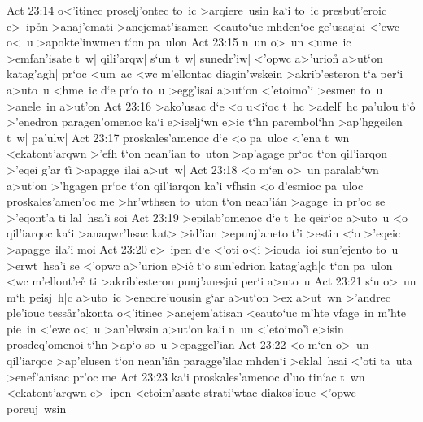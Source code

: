 \vs Act 23:14
o<'itinec
proselj'ontec
to~ic
>arqiere~usin
ka`i
to~ic
presbut'eroic
e>~ip\r{o}n
>anaj'emati
>anejemat'isamen
<eauto`uc
mhden`oc
ge'usasjai
<'ewc
o<~u
>apokte'inwmen
t`on
pa~ulon\bibvsend
\vs Act 23:15
n~un
o>~un
<ume~ic
>emfan'isate
t~w|
qili'arqw|
s`un
t~w|
sunedr'iw|
<'opwc
a>'urion\r{}
a>ut`on
katag'agh|
pr`oc
<um~ac
<wc
m'ellontac
diagin'wskein
>akrib'esteron
t`a
per`i
a>uto~u
<hme~ic
d`e
pr`o
to~u
>egg'isai
a>ut`on
<'etoimo'i
>esmen
to~u
>anele~in
a>ut'on\bibvsend
\vs Act 23:16
>ako'usac
d`e
<o
u<i`oc
t~hc
>adelf~hc
pa'ulou
t`o\r{}
>'enedron
paragen'omenoc
ka`i
e>iselj`wn
e>ic
t`hn
parembol`hn
>ap'hggeilen
t~w|
pa'ulw|\bibvsend
\vs Act 23:17
proskales'amenoc
d`e
<o
pa~uloc
<'ena
t~wn
<ekatont'arqwn
>'efh
t`on
nean'ian
to~uton
>ap'agage
pr`oc
t`on
qil'iarqon
>'eqei
g'ar
ti\r{}
>apagge~ilai
a>ut~w|\bibvsend
\vs Act 23:18
<o
m`en
o>~un
paralab`wn
a>ut`on
>'hgagen
pr`oc
t`on
qil'iarqon
ka'i
vfhsin
<o
d'esmioc
pa~uloc
proskales'amen'oc
me
>hr'wthsen
to~uton
t`on
nean'i\r{a}n
>agage~in
pr'oc
se
>'eqont'a
ti
lal~hsa'i
soi\bibvsend
\vs Act 23:19
>epilab'omenoc
d`e
t~hc
qeir`oc
a>uto~u
<o
qil'iarqoc
ka`i
>anaqwr'hsac
kat>
>id'ian
>epunj'aneto
t'i
>estin
<`o
>'eqeic
>apagge~ila'i
moi\bibvsend
\vs Act 23:20
e>~ipen
d`e
<'oti
o<i
>iouda~ioi
sun'ejento
to~u
>erwt~hsa'i
se
<'opwc
a>'urion
e>ic\r{}
t`o
sun'edrion
katag'agh|c
t`on
pa~ulon
<wc
m'ellont'e\r{c}
ti
>akrib'esteron
punj'anesjai
per`i
a>uto~u\bibvsend
\vs Act 23:21
s`u
o>~un
m`h
peisj~h|c
a>uto~ic
>enedre'uousin
g`ar
a>ut`on
>ex
a>ut~wn
>'andrec
ple'iouc
tess\r{a}r'akonta
o<'itinec
>anejem'atisan
<eauto`uc
m'hte
vfage~in
m'hte
pie~in
<'ewc
o<~u
>an'elwsin
a>ut`on
ka`i
n~un
<'etoimo'i\r{}
e>isin
prosdeq'omenoi
t`hn
>ap`o
so~u
>epaggel'ian\bibvsend
\vs Act 23:22
<o
m`en
o>~un
qil'iarqoc
>ap'elusen
t`on
nean'i\r{a}n
paragge'ilac
mhden`i
>eklal~hsai
<'oti
ta~uta
>enef'anisac
pr'oc
me\bibvsend
\vs Act 23:23
ka`i
proskales'amenoc
d'uo
tin`ac
t~wn
<ekatont'arqwn
e>~ipen
<etoim'asate
strati'wtac
diakos'iouc
<'opwc
poreuj~wsin
